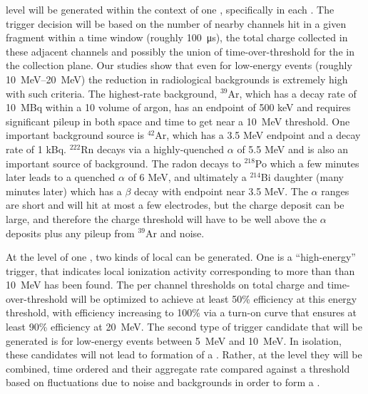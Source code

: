  level  will be generated within
the context of one , specifically in each . 
The trigger decision will be based on the number of nearby channels
hit in a given fragment within a time window (roughly \SI{100}{\us}),
the total charge collected in these adjacent channels and possibly the
union of time-over-threshold for the  in the
collection plane.
Our studies show that even for low-energy events (roughly
\SIrange{10}{20}{\MeV}) the reduction in radiological backgrounds is
extremely high with such criteria.
The highest-rate background, $^{39}$Ar, which has a decay rate of
10~MBq within a \SI{10}{\kton} volume of argon, has an endpoint of 500
keV and requires significant pileup in both space and time to get near
a \SI{10}{\MeV} threshold.
One important background source is $^{42}$Ar, which has a 3.5 MeV
endpoint and a decay rate of 1 kBq. 
$^{222}$Rn decays via a highly-quenched $\alpha$ of 5.5 MeV and is
also an important source of background.
The radon decays to $^{218}$Po which a few minutes later leads to a
quenched $\alpha$ of 6 MeV, and ultimately a $^{214}$Bi daughter (many
minutes later) which has a $\beta$ decay with endpoint near 3.5 MeV. 
The $\alpha$ ranges are short and will hit at most a few electrodes,
but the charge deposit can be large, and therefore the charge
threshold will have to be well above the $\alpha$ deposits plus any
pileup from $^{39}$Ar and noise.

At the level of one , two kinds of local
 can be generated.
One is a ``high-energy'' trigger, that indicates local ionization
activity corresponding to more than than \SI{10}{\MeV} has been found.
The per channel thresholds on total charge and time-over-threshold
will be optimized to achieve at least 50\% efficiency at this energy
threshold, with efficiency increasing to 100\% via a turn-on curve
that ensures at least 90\% efficiency at \SI{20}{\MeV}. 
The second type of trigger candidate that will be generated is for
low-energy events between \SI{5}{\MeV} and \SI{10}{\MeV}. 
In isolation, these candidates will not lead to formation of a
. 
Rather, at the  level they will be combined, time
ordered and their aggregate rate compared against a threshold based on
fluctuations due to noise and backgrounds in order to form a
 .

